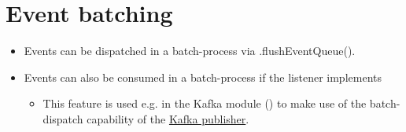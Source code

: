 \section{Event batching}
\label{feature:EventBatching}
\ClearAPI
\begin{itemize}
	\item Events can be dispatched in a batch-process via .flushEventQueue().
	\item Events can also be consumed in a batch-process if the listener implements 
	\begin{itemize}
		\item This feature is used e.g. in the  Kafka module () to make use of the batch-dispatch capability of the \href{http://www.osthus.com/ambeth/javadoc/}{Kafka publisher}.
	\end{itemize}
\end{itemize}

